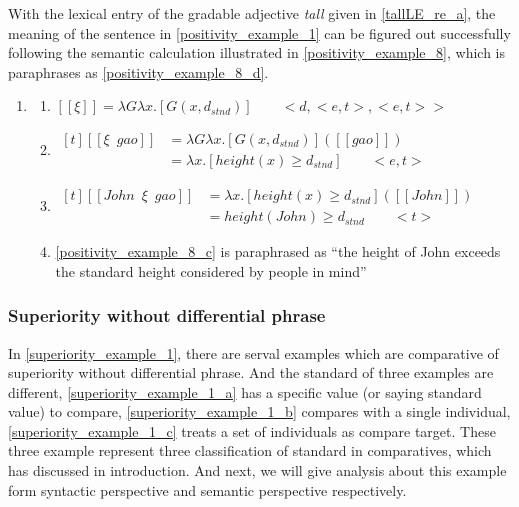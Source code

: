 \documentclass{ctexart}
\begin{document}
With the lexical entry of the gradable adjective \textit{tall} given in \ref{tallLE_re_a}, the meaning of the sentence in \ref{positivity_example_1} can be figured out successfully following the semantic calculation illustrated in \ref{positivity_example_8}, which is paraphrases as \ref{positivity_example_8_d}.

\begin{enumerate}
    \item \label{positivity_example_8}
    \begin{enumerate}
        \item \label{positivity_example_8_a}
        $[\![\xi]\!]=\lambda G \lambda x. [G(x,d_{stnd})] \qquad <d,<e,t>,<e,t>>$

        \item \label{positivity_example_8_b}
        $\begin{aligned}[t]
            [\![\xi \enspace gao]\!] &= \lambda G \lambda x. [G(x,d_{stnd})]([\![gao]\!]) \\
            &= \lambda x.[height(x) \geq d_{stnd}] \qquad <e,t>
        \end{aligned}$

        \item \label{positivity_example_8_c}
        $\begin{aligned}[t]
            [\![John \enspace \xi \enspace gao]\!] &= \lambda x.[height(x) \geq d_{stnd}]([\![John]\!]) \\
            &= height(John) \geq d_{stnd} \qquad <t>
        \end{aligned}$

        \item \label{positivity_example_8_d}
        \ref{positivity_example_8_c} is paraphrased as ``the height of John exceeds the standard height considered by people in mind''

    \end{enumerate}
\end{enumerate}


\subsubsection{Superiority without differential phrase}

\noindent
In \ref{superiority_example_1}, there are serval examples which are comparative of superiority without differential phrase. And the standard of three examples are different, \ref{superiority_example_1_a} has a specific value (or saying standard value) to compare, \ref{superiority_example_1_b} compares with a single individual, \ref{superiority_example_1_c} treats a set of individuals as compare target. These three example represent three classification of standard in comparatives, which has discussed in introduction. And next, we will give analysis about this example form syntactic perspective and semantic perspective respectively.
\end{document}
